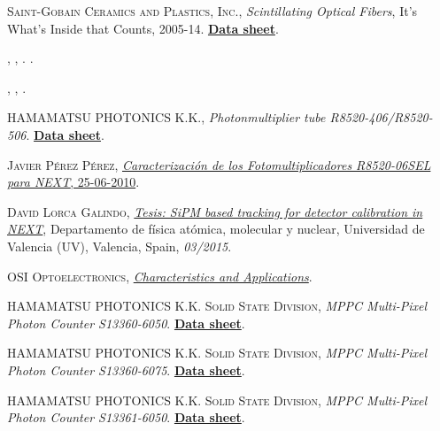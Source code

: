 \begin{thebibliography}{100}
 \textsc{Saint-Gobain Ceramics and Plastics, Inc.},
\textit{Scintillating Optical Fibers}, It's What's Inside that Counts, 2005-14. \href{https://www.crystals.saint-gobain.com/products/scintillating-fiber}{\textbf{Data sheet}}. 

 \textsc{},
\textit{}, . \href{}{\textbf{}}. 


 \textsc{},
\textit{}, \href{}{\textbf{}}. 

 \textsc{HAMAMATSU PHOTONICS K.K.},
\textit{Photonmultiplier tube R8520-406/R8520-506}. \href{https://www.hamamatsu.com/eu/en/product/type/R8520-406/index.html}{\textbf{Data sheet}}.

 \textsc{Javier Pérez Pérez},
 \href{https://next.ific.uv.es/cgi-bin/DocDB/public/ShowDocument?docid=48}{\textit{Caracterización de los Fotomultiplicadores R8520-06SEL para NEXT}, 25-06-2010}.

 \textsc{David Lorca Galindo},
\href{https://dialnet.unirioja.es/servlet/tesis?codigo=101465}{\textit{Tesis: SiPM based tracking for detector calibration in NEXT}}, Departamento de física atómica, molecular y nuclear, Universidad de Valencia (UV), Valencia, Spain, \textit{03/2015}.

 \textsc{OSI Optoelectronics}, 
\href{https://osioptoelectronics.com/standard-products/default.aspx?gclid=EAIaIQobChMIkYrLif_37QIVDNTtCh3NuwpkEAAYASAAEgKMJ_D_BwE}{\textit{Characteristics and Applications}}.

 \textsc{HAMAMATSU PHOTONICS K.K. Solid State Division},
\textit{MPPC Multi-Pixel Photon Counter S13360-6050}. \href{https://www.hamamatsu.com/eu/en/product/type/S13360-6050CS/index.html}{\textbf{Data sheet}}.

 \textsc{HAMAMATSU PHOTONICS K.K. Solid State Division},
\textit{MPPC Multi-Pixel Photon Counter S13360-6075}. \href{https://www.hamamatsu.com/eu/en/product/type/S13360-6075CS/index.html}{\textbf{Data sheet}}.

 \textsc{HAMAMATSU PHOTONICS K.K. Solid State Division},
\textit{MPPC Multi-Pixel Photon Counter S13361-6050}. \href{https://www.hamamatsu.com/us/en/product/type/S13361-6050AE-04/index.html}{\textbf{Data sheet}}.


\end{thebibliography}

